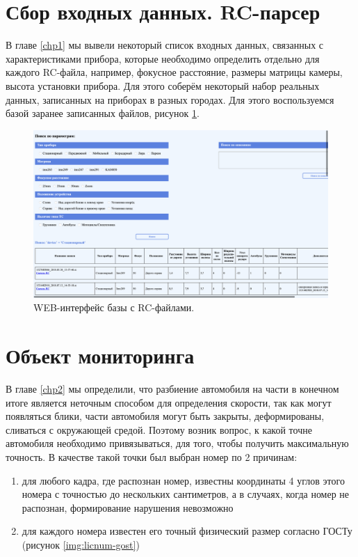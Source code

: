 \documentclass[specification,annotation,times]{itmo-student-thesis}
\begin{document}
\section{Сбор входных данных. RC-парсер}
В главе \ref{chp1} мы вывели некоторый список входных данных, связанных с характеристиками прибора, которые необходимо определить отдельно для каждого RC-файла, например, фокусное расстояние, размеры матрицы камеры, высота установки прибора. Для этого соберём некоторый набор реальных данных, записанных на приборах в разных городах. Для этого воспользуемся базой заранее записанных файлов, рисунок \ref{img:web-rc}.

\begin{figure}[!ht]
	\caption{WEB-интерфейс базы с RC-файлами.}\label{img:web-rc}
	\includegraphics[width=0.85\linewidth]{../png/web_rc.png}
	\centering
\end{figure}

\section{Объект мониторинга} \label{sec:monitor}
В главе \ref{chp2} мы определили, что разбиение автомобиля на части в конечном итоге является неточным способом для определения скорости, так как могут появляться блики, части автомобиля могут быть закрыты, деформированы, сливаться с окружающей средой. Поэтому возник вопрос, к какой точне автомобиля необходимо привязываться, для того, чтобы получить максимальную точность. В качестве такой точки был выбран номер по 2 причинам:

\begin{enumerate}
	\item для любого кадра, где распознан номер, известны координаты 4 углов этого номера с точностью до нескольких сантиметров, а в случаях, когда номер не распознан, формирование нарушения невозможно
	\item для каждого номера известен его точный физический размер согласно ГОСТу (рисунок \ref{img:licnum-gost})
\end{enumerate}
\end{document}
